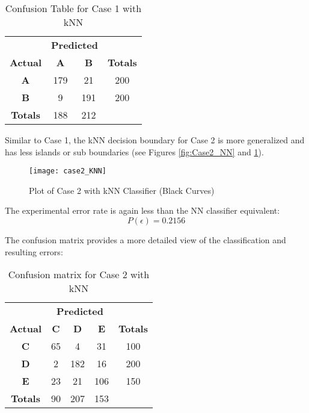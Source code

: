 \documentclass{article}
\begin{document}
\begin{table}[H]
    \centering
    \begin{tabular}{c|c c|c|}
        & \multicolumn{2}{c|}{\textbf{Predicted}} \\
        \textbf{Actual} & \textbf{A} & \textbf{B} & \textbf{Totals} \\
        \hline
        \textbf{A} & 179 \cellcolor[gray]{.8} & 21 & 200\\
        \textbf{B} & 9 & 191 \cellcolor[gray]{.8} & 200\\\hline
        \textbf{Totals} & 188 & 212\\
        \cline{1-3}
    \end{tabular}
    \caption{Confusion Table for Case 1 with kNN}
    \label{tab:Case1_KNN_error}
\end{table}

Similar to Case 1, the kNN decision boundary for Case 2 is more generalized and has less islands or sub boundaries (see Figures \ref{fig:Case2_NN} and \ref{fig:Case2_KNN}).

\begin{figure}[H]
\caption{Plot of Case 2 with kNN Classifier (Black Curves)}
\centering
\texttt{[image: case2\_KNN]}
\label{fig:Case2_KNN}
\end{figure}

The experimental error rate is again less than the NN classifier equivalent:
\begin{equation}
    P(\epsilon) = 0.2156
\end{equation}

The confusion matrix provides a more detailed view of the classification and resulting errors:

\begin{table}[H]
    \centering
    \begin{tabular}{c|c c c|c|}
        & \multicolumn{3}{c|}{\textbf{Predicted}} \\
        \textbf{Actual} & \textbf{C} & \textbf{D} & \textbf{E} & \textbf{Totals} \\
        \hline
        \textbf{C} & 65 \cellcolor[gray]{.8} & 4 & 31 & 100 \\
        \textbf{D} & 2 & 182 \cellcolor[gray]{.8} & 16 & 200\\
        \textbf{E} & 23 & 21 & 106 \cellcolor[gray]{.8} & 150\\\hline
        \textbf{Totals} & 90 & 207 & 153\\
        \cline{1-4}
    \end{tabular}
    \caption{Confusion matrix for Case 2 with kNN}
    \label{tab:Case2_KNN_error}
\end{table}
\end{document}
